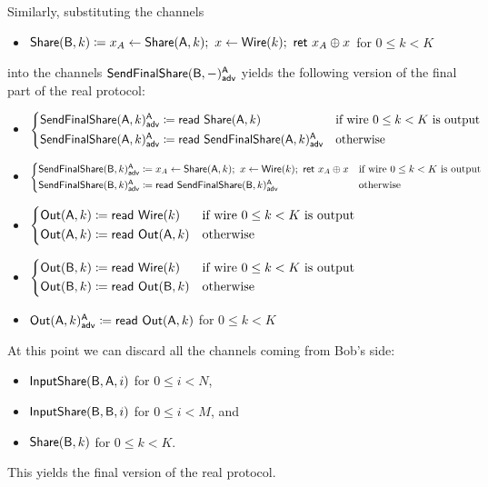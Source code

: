 \noindent Similarly, substituting the channels
\begin{itemize}
\item $\mathsf{Share}(\mathsf{B},k) \coloneqq x_A \leftarrow \mathsf{Share}(\mathsf{A},k); \ x \leftarrow \mathsf{Wire}(k); \ \mathsf{ret} \ x_A \oplus x$ for $0 \leq k < K$
\end{itemize}
into the channels $\mathsf{SendFinalShare}(\mathsf{B},-)^{\mathsf{A}}_{\mathsf{adv}}$ yields the following version of the final part of the real protocol:

\begin{itemize}
\item {\color{blue} $\begin{cases*} \LeakSendFinalShare(\A,k)^\A_\adv \coloneqq \read{\Share(\A,k)} & \text{if wire $0 \leq k < K$ is output} \\ \LeakSendFinalShare(\A,k)^\A_\adv \coloneqq \read{\LeakSendFinalShare(\A,k)^\A_\adv} & \text{otherwise} \end{cases*}$}
\item {\color{blue} $\begin{cases*} \LeakSendFinalShare(\B,k)^\A_\adv \coloneqq x_A \leftarrow \Share(\A,k); \ x \leftarrow \Wire(k); \ \ret{x_A \oplus x} & \text{if wire $0 \leq k < K$ is output} \\ \LeakSendFinalShare(\B,k)^\A_\adv \coloneqq \read{\LeakSendFinalShare(\B,k)^\A_\adv} & \text{otherwise} \end{cases*}$}
\item $\begin{cases*} \Out(\A,k) \coloneqq \read{\Wire(k)} & \text{if wire $0 \leq k < K$ is output} \\ \Out(\A,k) \coloneqq \read{\Out(\A,k)} & \text{otherwise} \end{cases*}$
\item $\begin{cases*} \Out(\B,k) \coloneqq \read{\Wire(k)} & \text{if wire $0 \leq k < K$ is output} \\ \Out(\B,k) \coloneqq \read{\Out(\B,k)} & \text{otherwise} \end{cases*}$
\item {\color{blue} $\mathsf{Out}(\mathsf{A},k)^{\mathsf{A}}_{\mathsf{adv}} \coloneqq \mathsf{read} \ \mathsf{Out}(\mathsf{A},k)$ for $0 \leq k < K$}
\end{itemize}

\noindent At this point we can discard all the channels coming from Bob's side:
\begin{itemize}
\item $\mathsf{InputShare}(\mathsf{B},\mathsf{A},i)$ for $0 \leq i < N$,
\item $\mathsf{InputShare}(\mathsf{B},\mathsf{B},i)$ for $0 \leq i < M$, and
\item $\mathsf{Share}(\mathsf{B},k)$ for $0 \leq k < K$.
\end{itemize}
This yields the final version of the real protocol.

